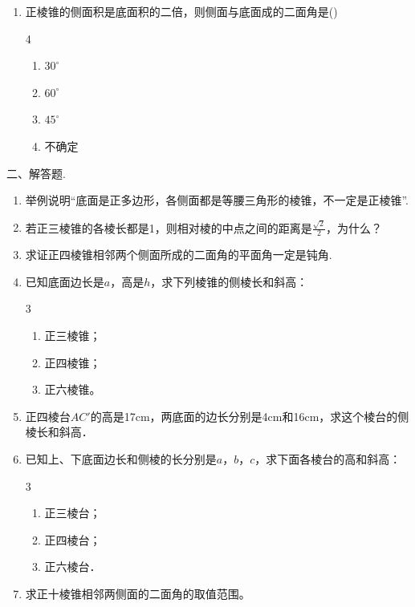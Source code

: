 \begin{enumerate}
\item 正棱锥的侧面积是底面积的二倍，则侧面与底面成的二面角是\hfill (\qquad )
\begin{multicols}{4}
    \begin{enumerate}[(1)]
        \item $30^{\circ}$
        \item $60^{\circ}$
        \item $45^{\circ}$
        \item 不确定
    \end{enumerate}
    \end{multicols}
\end{enumerate}

二、解答题.
\begin{enumerate}
\item 举例说明“底面是正多边形，各侧面都是等腰三角形的棱锥，不一定是正棱锥”.
\item 若正三棱锥的各棱长都是1，则相对棱的中点之间的距离是$\frac{\sqrt{2}}{2}$，为什么？ 
\item 求证正四棱锥相邻两个侧面所成的二面角的平面角一定是钝角.
\item 已知底面边长是$a$，高是$h$，求下列棱锥的侧棱长和斜高：
\begin{multicols}{3}
\begin{enumerate}[(1)]
    \item 正三棱锥；
    \item 正四棱锥；
    \item 正六棱锥。
\end{enumerate}
\end{multicols}

\item 正四棱台$AC'$的高是17cm，两底面的边长分别是4cm和16cm，求这个棱台的侧棱长和斜高．
\item 已知上、下底面边长和侧棱的长分别是$a$，$b$，$c$，求下面各棱台的高和斜高：
\begin{multicols}{3}
    \begin{enumerate}[(1)]
        \item 正三棱台；  \item 正四棱台；  \item 正六棱台．
    \end{enumerate}
    \end{multicols}

\item 求正十棱锥相邻两侧面的二面角的取值范围。
\end{enumerate}

